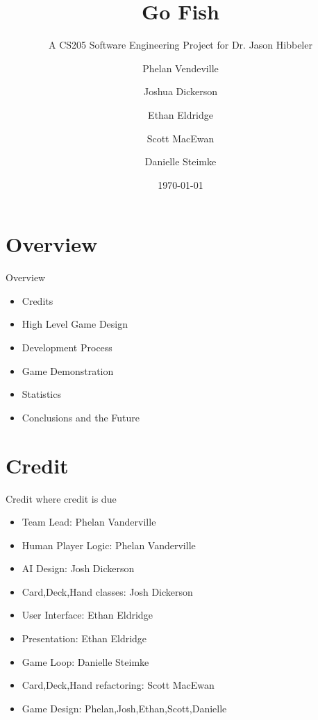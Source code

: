 \documentclass[compress, blue]{beamer}
\begin{document}
\title{Go Fish}   
\subtitle{A CS205 Software Engineering Project for Dr. Jason Hibbeler}
\author[Phelan,Josh,Ethan,Scott,Danielle]{Phelan Vendeville \and Joshua Dickerson \and Ethan Eldridge \and Scott MacEwan\and  Danielle Steimke} 
\date{\today} 



\begin{frame}
\maketitle
\end{frame}

\section{Overview}

\begin{frame}{Overview}

\begin{itemize}
\item<1>Credits
\item<1>High Level Game Design
\item<1>Development Process
\item<1>Game Demonstration
\item<1>Statistics
\item<1>Conclusions and the Future
\end{itemize}

\end{frame}

\section{Credit}

\begin{frame}{Credit where credit is due}
\begin{itemize}
\item<1>Team Lead: Phelan Vanderville
\item<1>Human Player Logic: Phelan Vanderville
\item<2>AI Design: Josh Dickerson
\item<2>Card,Deck,Hand classes: Josh Dickerson
\item<3>User Interface: Ethan Eldridge
\item<3>Presentation: Ethan Eldridge
\item<4>Game Loop: Danielle Steimke
\item<5>Card,Deck,Hand refactoring: Scott MacEwan
\item<6>Game Design: Phelan,Josh,Ethan,Scott,Danielle
\end{itemize}
\end{frame}
\end{document}
